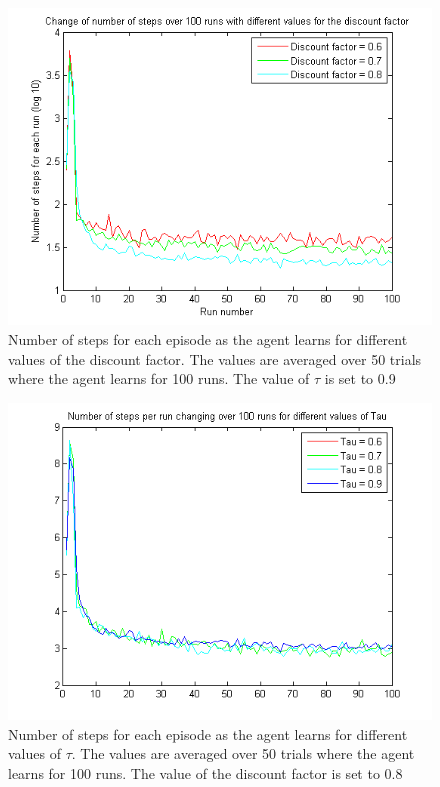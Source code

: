 \documentclass{article}
\begin{document}
\begin{figure}
\centering
\caption{Number of steps for each episode as the agent learns for different values of the discount factor. The values are averaged over 50 trials where the agent learns for 100 runs. The value of $\tau$ is set to 0.9}
\label{fig:onLineMonteCarloDiscount}
\includegraphics[scale=0.8]{averagesInOneFig_online_discountFact.png}
\end{figure}

\begin{figure}
\centering
\caption{Number of steps for each episode as the agent learns for different values of $\tau$. The values are averaged over 50 trials where the agent learns for 100 runs. The value of the discount factor is set to 0.8}
\label{fig:onLineMonteCarloTau}
\includegraphics[scale=0.8]{averagesInOneFig_online_Tau.png}
\end{figure}
\end{document}
